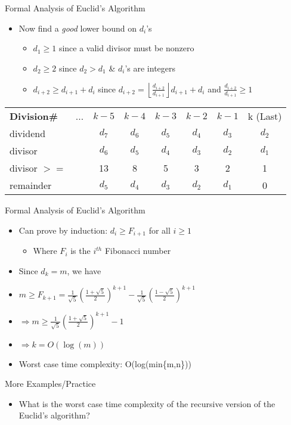 \item Formal Analysis of Euclid's Algorithm
  \begin{itemize}
  \item Now find a \emph{good} lower bound on $d_{i}$'s
    \begin{itemize}
    \item $d_{1}\geq 1$   since a valid divisor must be nonzero
    \item $d_{2}\geq 2$   since $d_{2}>d_{1}$ \& $d_{i}$'s are integers
    \item $d_{i+2}\geq d_{i+1} +d_{i}$ since $d_{i+2}=\left\lfloor\frac{d_{i+2}}{d_{i+1}}\right\rfloor d_{i+1}+d_{i}$ and $\frac{d_{i+2}}{d_{i+1}}\geq 1$
    \end{itemize}
  \end{itemize}
  \begin{tabular}{l c c c c c c c}
  \rowcolor{LightCyan} \textbf{Division\#} & ... & $k-5$ & $k-4$ & $k-3$ & $k-2$  & $k-1$ & k (Last) \\
  \rowcolor{DarkCyan} dividend & & $d_{7}$ & $d_{6}$ & $d_{5}$ & $d_{4}$ & $d_{3}$ & $d_{2}$ \\
  \rowcolor{LightCyan} divisor & & $d_{6}$ & $d_{5}$ & $d_{4}$ & $d_{3}$ & $d_{2}$ & $d_{1}$ \\
  \rowcolor{DarkCyan} divisor $>=$ & & 13 & 8 & 5 & 3 & 2 & 1 \\
  \rowcolor{LightCyan} remainder & & $d_{5}$ & $d_{4}$ & $d_{3}$ & $d_{2}$ & $d_{1}$ & 0 \\
  \end{tabular}
\item Formal Analysis of Euclid's Algorithm
  \begin{itemize}
  \item Can prove by induction: $d_{i}\geq F_{i+1}$ for all $i\geq 1$
    \begin{itemize}
    \item Where $F_{i}$ is the $i^{th}$ Fibonacci number
    \end{itemize}
  \item Since $d_{k}=m$, we have 
  \item [] $m\geq F_{k+1}=\frac{1}{\sqrt{5}}\left(\frac{1+\sqrt{5}}{2}\right)^{k+1} -\frac{1}{\sqrt{5}}\left(\frac{1-\sqrt{5}}{2}\right)^{k+1}$ 
  \item [] $\Rightarrow m\geq\frac{1}{\sqrt{5}}\left(\frac{1+\sqrt{5}}{2}\right)^{k+1}-1$ 
  \item [] $\Rightarrow k=O(\log{(m)})$
  \item Worst case time complexity: O(log(min\{m,n\}))
  \end{itemize}
\item {\color{green}More Examples/Practice}
  \begin{itemize}
  \item What is the worst case time complexity of the recursive version of the Euclid’s algorithm?
  \end{itemize}
